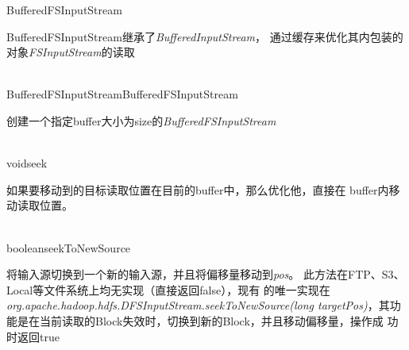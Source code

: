 \begin{XeClass}{BufferedFSInputStream}
   
 BufferedFSInputStream继承了\emph{BufferedInputStream}，
 通过缓存来优化其内包装的对象\emph{FSInputStream}的读取

  \begin{XeMethod}{\XePublic\\ }{BufferedFSInputStream}{BufferedFSInputStream}
       
 创建一个指定buffer大小为size的\emph{BufferedFSInputStream}

  \end{XeMethod}

  \begin{XeMethod}{\XePublic\\ }{void}{seek}
       
 如果要移动到的目标读取位置在目前的buffer中，那么优化他，直接在
 buffer内移动读取位置。

  \end{XeMethod}

  \begin{XeMethod}{\XePublic\\ }{boolean}{seekToNewSource}
       
 将输入源切换到一个新的输入源，并且将偏移量移动到\emph{pos}。
 此方法在FTP、S3、Local等文件系统上均无实现（直接返回false），现有
 的唯一实现在\emph{org.apache.hadoop.hdfs.DFSInputStream.seekToNewSource(long targetPos)}，其功能是在当前读取的Block失效时，切换到新的Block，并且移动偏移量，操作成
 功时返回true

  \end{XeMethod}

\end{XeClass}
